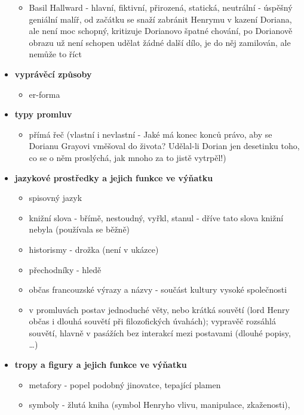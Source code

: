 \documentclass[11pt]{article}
\begin{document}
\begin{itemize}
\begin{itemize}
            \item Basil Hallward - hlavní, fiktivní, přirozená, statická, neutrální - úspěšný geniální malíř, od začátku se snaží zabránit Henrymu v kazení Doriana, ale není moc schopný, kritizuje Dorianovo špatné chování, po Dorianově obrazu už není schopen udělat žádné další dílo, je do něj zamilován, ale nemůže to říct
        \end{itemize}
        \item\textbf{vyprávěcí způsoby}
        \begin{itemize}
            \item er-forma
        \end{itemize}
        \item\textbf{typy promluv}
        \begin{itemize}
            \item přímá řeč (vlastní i nevlastní - Jaké má konec konců právo, aby se Dorianu Grayovi vměšoval do života? Udělal-li Dorian jen desetinku toho, co se o něm proslýchá, jak mnoho za to jistě vytrpěl!)
        \end{itemize}
        \item\textbf{jazykové prostředky a jejich funkce ve výňatku}
        \begin{itemize}
            \item spisovný jazyk
            \item knižní slova - břímě, nestoudný, vyřkl, stanul - dříve tato slova knižní nebyla (používala se běžně)
            \item historismy - drožka (není v ukázce)
            \item přechodníky - hledě
            \item občas francouzské výrazy a názvy - součást kultury vysoké společnosti
            \item v promluvách postav jednoduché věty, nebo krátká souvětí (lord Henry občas i dlouhá souvětí při filozofických úvahách); vypravěč rozsáhlá souvětí, hlavně v pasážích bez interakcí mezi postavami (dlouhé popisy, \dots)
        \end{itemize}
        \item\textbf{tropy a figury a jejich funkce ve výňatku}
        \begin{itemize}
            \item metafory - popel podobný jinovatce, tepající plamen
            \item symboly - žlutá kniha (symbol Henryho vlivu, manipulace, zkaženosti), 
        \end{itemize}
    \end{itemize}
\end{document}
